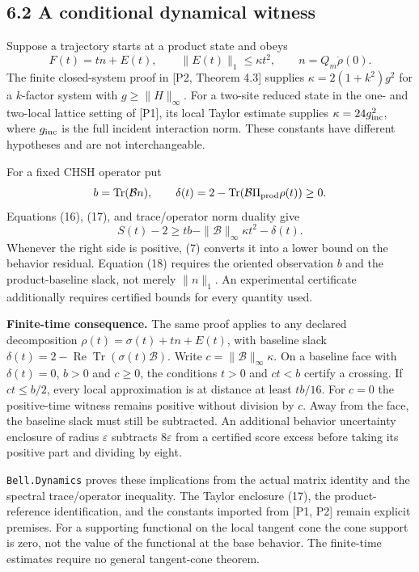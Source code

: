\documentclass[
]{article}
\begin{document}
\subsection{6.2 A conditional dynamical witness}\label{a-conditional-dynamical-witness}

Suppose a trajectory starts at a product state and obeys
\[
F(t)=t n+E(t),\qquad \|E(t)\|_1\le\kappa t^2,
\qquad n=Q_m\dot\rho(0).
\tag{17}
\]
The finite closed-system proof in {[}P2, Theorem 4.3{]} supplies \(\kappa=2(1+k^2)g^2\) for a \(k\)-factor system with \(g\ge\|H\|_\infty\). For a two-site reduced state in the one- and two-local lattice setting of {[}P1{]}, its local Taylor estimate supplies \(\kappa=24g_{\rm inc}^2\), where \(g_{\rm inc}\) is the full incident interaction norm. These constants have different hypotheses and are not interchangeable.

For a fixed CHSH operator put
\[
b=\operatorname{Tr}(\mathcal B n),\qquad
\delta(t)=2-\operatorname{Tr}(\mathcal B\Pi_{\rm prod}\rho(t))\ge0.
\]
Equations (16), (17), and trace/operator norm duality give
\[
S(t)-2\ge t b-\|\mathcal B\|_\infty\kappa t^2-\delta(t).
\tag{18}
\]
Whenever the right side is positive, (7) converts it into a lower bound on the behavior residual. Equation (18) requires the oriented observation \(b\) and the product-baseline slack, not merely \(\|n\|_1\). An experimental certificate additionally requires certified bounds for every quantity used.

\textbf{Finite-time consequence.} The same proof applies to any declared decomposition \(\rho(t)=\sigma(t)+t n+E(t)\), with baseline slack \(\delta(t)=2-\operatorname{Re}\operatorname{Tr}(\sigma(t)\mathcal B)\). Write \(c=\|\mathcal B\|_\infty\kappa\). On a baseline face with \(\delta(t)=0\), \(b>0\) and \(c\ge0\), the conditions \(t>0\) and \(ct<b\) certify a crossing. If \(ct\le b/2\), every local approximation is at distance at least \(tb/16\). For \(c=0\) the positive-time witness remains positive without division by \(c\). Away from the face, the baseline slack must still be subtracted. An additional behavior uncertainty enclosure of radius \(\varepsilon\) subtracts \(8\varepsilon\) from a certified score excess before taking its positive part and dividing by eight.

\texttt{Bell.Dynamics} proves these implications from the actual matrix identity and the spectral trace/operator inequality. The Taylor enclosure (17), the product-reference identification, and the constants imported from {[}P1, P2{]} remain explicit premises. For a supporting functional on the local tangent cone the cone support is zero, not the value of the functional at the base behavior. The finite-time estimates require no general tangent-cone theorem.
\end{document}
